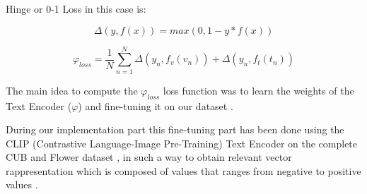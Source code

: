 Hinge or 0-1 Loss in this case is:

\begin{equation}
    \Delta( y, f(x) ) = max (0 , 1 - y * f(x) )
\end{equation}



\begin{equation}
    \varphi_{loss} = \frac{1}{N} \sum_{n=1}^{N} \Delta(y_n, f_v(v_n)) + \Delta(y_n, f_t(t_n)) 
\end{equation}

The main idea to compute the $\varphi_{loss}$ loss function was to learn the weights of 
the Text Encoder ($\varphi$) and fine-tuning it on our dataset .

During our implementation part this fine-tuning part has been done using 
the CLIP (Contrastive Language-Image Pre-Training) Text Encoder on the 
complete CUB and Flower dataset , in such a way to obtain 
relevant vector rappresentation which is composed of values that ranges 
from negative to positive values .

